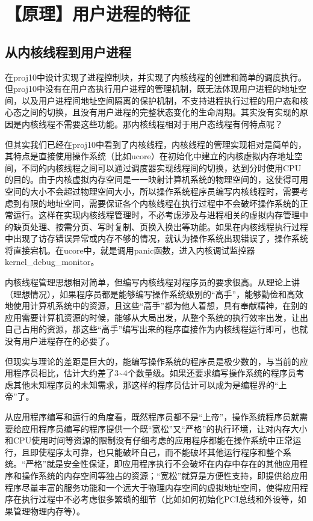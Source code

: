 \section{【原理】用户进程的特征}\label{ux539fux7406ux7528ux6237ux8fdbux7a0bux7684ux7279ux5f81}

\subsection{从内核线程到用户进程}\label{ux4eceux5185ux6838ux7ebfux7a0bux5230ux7528ux6237ux8fdbux7a0b}

在proj10中设计实现了进程控制块，并实现了内核线程的创建和简单的调度执行。但proj10中没有在用户态执行用户进程的管理机制，既无法体现用户进程的地址空间，以及用户进程间地址空间隔离的保护机制，不支持进程执行过程的用户态和核心态之间的切换，且没有用户进程的完整状态变化的生命周期。其实没有实现的原因是内核线程不需要这些功能。那内核线程相对于用户态线程有何特点呢？

但其实我们已经在proj10中看到了内核线程，内核线程的管理实现相对是简单的，其特点是直接使用操作系统（比如ucore）在初始化中建立的内核虚拟内存地址空间，不同的内核线程之间可以通过调度器实现线程间的切换，达到分时使用CPU的目的。由于内核虚拟内存空间是一一映射计算机系统的物理空间的，这使得可用空间的大小不会超过物理空间大小，所以操作系统程序员编写内核线程时，需要考虑到有限的地址空间，需要保证各个内核线程在执行过程中不会破坏操作系统的正常运行。这样在实现内核线程管理时，不必考虑涉及与进程相关的虚拟内存管理中的缺页处理、按需分页、写时复制、页换入换出等功能。如果在内核线程执行过程中出现了访存错误异常或内存不够的情况，就认为操作系统出现错误了，操作系统将直接宕机。在ucore中，就是调用panic函数，进入内核调试监控器kernel\_debug\_monitor。

内核线程管理思想相对简单，但编写内核线程对程序员的要求很高。从理论上讲（理想情况），如果程序员都是能够编写操作系统级别的``高手''，能够勤俭和高效地使用计算机系统中的资源，且这些``高手''都为他人着想，具有奉献精神，在别的应用需要计算机资源的时候，能够从大局出发，从整个系统的执行效率出发，让出自己占用的资源，那这些``高手''编写出来的程序直接作为内核线程运行即可，也就没有用户进程存在的必要了。

但现实与理论的差距是巨大的，能编写操作系统的程序员是极少数的，与当前的应用程序员相比，估计大约差了3\textasciitilde{}4个数量级。如果还要求编写操作系统的程序员考虑其他未知程序员的未知需求，那这样的程序员估计可以成为是编程界的``上帝''了。

从应用程序编写和运行的角度看，既然程序员都不是``上帝''，操作系统程序员就需要给应用程序员编写的程序提供一个既``宽松''又``严格''的执行环境，让对内存大小和CPU使用时间等资源的限制没有仔细考虑的应用程序都能在操作系统中正常运行，且即使程序太可靠，也只能破坏自己，而不能破坏其他运行程序和整个系统。``严格''就是安全性保证，即应用程序执行不会破坏在内存中存在的其他应用程序和操作系统的内存空间等独占的资源；``宽松''就算是方便性支持，即提供给应用程序尽量丰富的服务功能和一个远大于物理内存空间的虚拟地址空间，使得应用程序在执行过程中不必考虑很多繁琐的细节（比如如何初始化PCI总线和外设等，如果管理物理内存等）。

